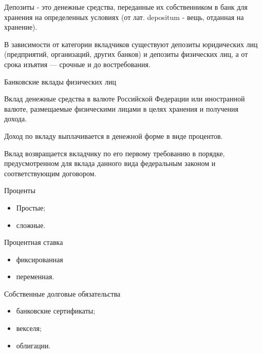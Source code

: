 \documentclass[_Banking_p2.tex]{subfiles}
\begin{document}
\begin{frame}
\begin{block}{Депозиты}
\quad
- это денежные средства, переданные их собственником в банк для хранения на определенных условиях (от лат. depositum - вещь, отданная на хранение).
\end{block}
В зависимости от категории вкладчиков существуют депозиты юридических лиц (предприятий, организаций, других банков) и депозиты физических лиц, а от срока изъятия — срочные и до востребования.
\end{frame}

\begin{frame}{Банковские вклады физических лиц}
\begin{block}{Вклад}
денежные средства в валюте Российской Федерации или иностранной валюте, размещаемые физическими лицами в целях хранения и получения дохода.
\end{block}
Доход по вкладу выплачивается в денежной форме в виде процентов. 

Вклад возвращается вкладчику по его первому требованию в порядке, предусмотренном для вклада данного вида федеральным законом и соответствующим договором.
\end{frame}

\begin{frame}
\begin{block}{Проценты}
\begin{itemize}
\item
Простые;
\item
сложные.
\end{itemize}
\end{block}

\begin{block}{Процентная ставка }
\begin{itemize}
\item
фиксированная 
\item
переменная.
\end{itemize}
\end{block}
\end{frame}

\begin{frame}{Собственные долговые обязательства}
\begin{itemize}
\item
банковские сертификаты;
\item
векселя;
\item
облигации.
\end{itemize}
\end{frame}
\end{document}
